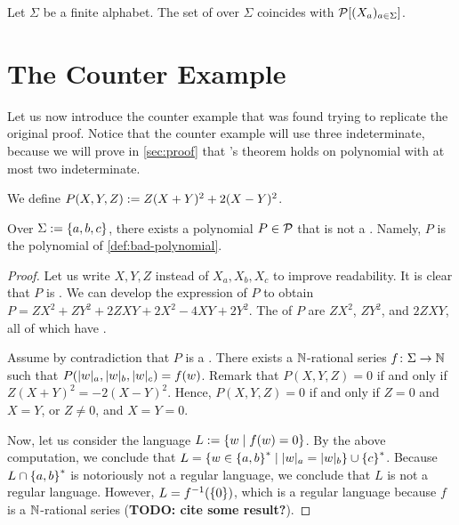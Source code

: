 \documentclass[a4paper,11pt]{article}
\begin{document}
\begin{theorem} 
    Let $\Sigma$ be a finite alphabet.
    The set of  over $\Sigma$
    coincides with $\mathcal{P}[(X_a)_{a \in \Sigma}]$.
\end{theorem}

\section{The Counter Example}
\label{sec:c-example}

Let us now introduce the counter example that was found trying to
replicate the original proof. Notice that the counter example
will use three indeterminate, because we will prove
in \cref{sec:proof} that \citeauthor{KARH77}’s theorem holds
on polynomial with at most two indeterminate.

\begin{definition}
    \label{def:bad-polynomial}
    We define $P(X,Y,Z) \mathrel{:=} Z (X + Y)^2 + 2 (X - Y)^2$.
\end{definition}

\begin{theorem}
    \label{thm:counter-example}
    Over $\Sigma \mathrel{:=} \mathopen{\{} a,b,c \mathclose{\}}$,
    there exists a polynomial $P \in \mathcal{P}$ that is not
    a . Namely,
    $P$ is the polynomial of \cref{def:bad-polynomial}.
\end{theorem}
\begin{proof}
    Let us write $X,Y,Z$ instead of $X_a, X_b, X_c$ to improve
    readability.
    It is clear that $P$ is . We can develop
    the expression of $P$ to 
    obtain
    $P = ZX^2 + ZY^2 + 2ZXY + 2X^2 -4XY + 2Y^2$.
    The  of $P$
    are $ZX^2$, $ZY^2$, and $2ZXY$, all of which have
    .

    Assume by contradiction that $P$ is a .
    There exists a 
    $\mathbb{N}$-rational series $f \colon \Sigma \to \mathbb{N}$
    such that $P(\card[a]{w}, \card[b]{w}, \card[c]{w}) = f(w)$.
    Remark that $P(X,Y,Z) = 0$
    if and only if $Z(X+Y)^2 = -2 (X-Y)^2$. Hence,
    $P(X,Y,Z)=0$ if and only if $Z = 0$ and $X = Y$, or 
    $Z \neq 0$, and $X = Y = 0$.

    Now, let us consider the language $L \mathrel{:=} \mathopen{\{} w \mid  f(w) = 0 \mathclose{\}}$. By the
    above computation, we conclude that $L = \setof{ w \in \set{a,b}^* }{
    \card[a]{w} = \card[b]{w} } \cup \set{ c }^*$.
    Because $L \cap \mathopen{\{} a,b \mathclose{\}}^*$ is notoriously not a regular language, we
    conclude that $L$ is not a regular language.
    However, $L = f^{-1}(\mathopen{\{} 0 \mathclose{\}})$, which is a regular language
    because $f$ is a $\mathbb{N}$-rational series (\textbf{TODO: cite some result?}).
\end{proof}
\end{document}
